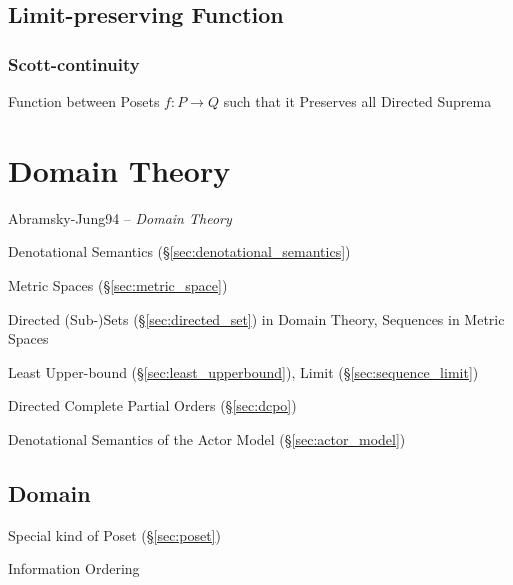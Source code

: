 \subsection{Limit-preserving Function}\label{sec:limit_preserving}

\subsubsection{Scott-continuity}\label{sec:scott_continuity}

Function between Posets $f : P \rightarrow Q$ such that it Preserves
all Directed Suprema %



\section{Domain Theory}\label{sec:domain_theory}

Abramsky-Jung94 -- \emph{Domain Theory}

Denotational Semantics (\S\ref{sec:denotational_semantics})

Metric Spaces (\S\ref{sec:metric_space})

Directed (Sub-)Sets (\S\ref{sec:directed_set}) in Domain Theory,
Sequences in Metric Spaces

Least Upper-bound (\S\ref{sec:least_upperbound}), Limit
(\S\ref{sec:sequence_limit})

Directed Complete Partial Orders (\S\ref{sec:dcpo})

Denotational Semantics of the Actor Model (\S\ref{sec:actor_model})



\subsection{Domain}\label{sec:order_domain}

Special kind of Poset (\S\ref{sec:poset})

Information Ordering



